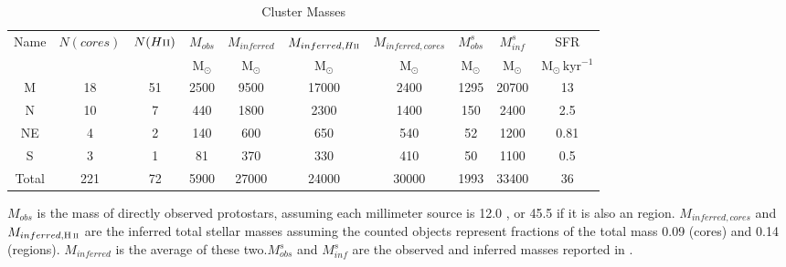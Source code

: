\begin{table*}[htp]
\centering
\caption{Cluster Masses}
\begin{tabular}{cccccccccc}
\label{tab:clustermassestimates}
Name & $N(cores)$ & $N(H\textsc{ii})$ & $M_{obs}$ & $M_{inferred}$ & $M_{inferred, H\textsc{ii}}$ & $M_{inferred, cores}$ & $M_{obs}^s$ & $M_{inf}^s$ & SFR \\
 &  &  & $\mathrm{M_{\odot}}$ & $\mathrm{M_{\odot}}$ & $\mathrm{M_{\odot}}$ & $\mathrm{M_{\odot}}$ & $\mathrm{M_{\odot}}$ & $\mathrm{M_{\odot}}$ & $\mathrm{M_{\odot}\,kyr^{-1}}$ \\
\hline
M & 18 & 51 & 2500 & 9500 & 17000 & 2400 & 1295 & 20700 & 13 \\
N & 10 & 7 & 440 & 1800 & 2300 & 1400 & 150 & 2400 & 2.5 \\
NE & 4 & 2 & 140 & 600 & 650 & 540 & 52 & 1200 & 0.81 \\
S & 3 & 1 & 81 & 370 & 330 & 410 & 50 & 1100 & 0.5 \\
Total & 221 & 72 & 5900 & 27000 & 24000 & 30000 & 1993 & 33400 & 36 \\
\hline
\end{tabular}
\par
$M_{obs}$ is the mass of directly observed protostars, assuming each millimeter source is 12.0 \msun, or 45.5 \msun if it is also an \hii region.  $M_{inferred,cores}$ and $M_{inferred,\hii}$ are the inferred total stellar masses assuming the counted objects represent fractions of the total mass 0.09 (cores) and 0.14 (\hii regions).  $M_{inferred}$ is the average of these two.$M_{obs}^s$ and $M_{inf}^s$ are the observed and inferred masses reported in \citet{Schmiedeke2016a}.
\end{table*}
